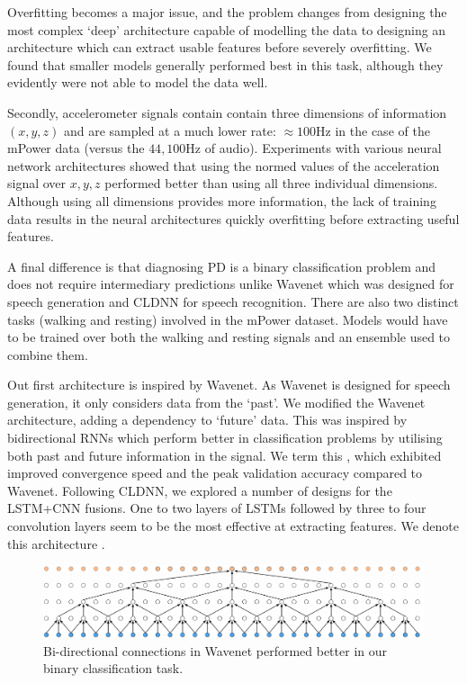 \documentclass[12pt, twoside]{book}
\renewcommand\emph[1]{\textit{\color{USred}{#1}}}
\begin{document}
Overfitting becomes a major issue, and the problem changes from designing the most complex `deep' architecture capable of modelling the data to designing an architecture which can extract usable features before severely overfitting. We found that smaller models generally performed best in this task, although they evidently were not able to model the data well. 

Secondly, accelerometer signals contain contain three dimensions of information $(x,y,z)$ and are sampled at a much lower rate: $\approx100$Hz in the case of the mPower data (versus the $44,100$Hz of audio). Experiments with various neural network architectures showed that using the normed values of the acceleration signal over $x,y,z$ performed better than using all three individual dimensions. Although using all dimensions provides more information, the lack of training data results in the neural architectures quickly overfitting before extracting useful features. 

A final difference is that diagnosing PD is a binary classification problem and does not require intermediary predictions unlike Wavenet which was designed for speech generation and CLDNN for speech recognition. There are also two distinct tasks (walking and resting) involved in the mPower dataset. Models would have to be trained over both the walking and resting signals and an ensemble used to combine them.  

Out first architecture is inspired by Wavenet. As Wavenet is designed for speech generation, it only considers data from the `past'. We modified the Wavenet architecture, adding a dependency to `future' data. This was inspired by bidirectional RNNs which perform better in classification problems by utilising both past and future information in the signal. We term this \emph{Bi-Wavenet}, which exhibited improved convergence speed and the peak validation accuracy compared to Wavenet. Following CLDNN, we explored a number of designs for the LSTM+CNN fusions. One to two layers of LSTMs followed by three to four convolution layers seem to be the most effective at extracting features. We denote this architecture \emph{LSTMConv}. 


\begin{figure}[h]
	\label{biwavenet}
	\centering\centerline{\includegraphics[width=1\linewidth]{biwavenet.png}}
	\caption{Bi-directional connections in Wavenet performed better in our binary classification task. }
\end{figure}
\end{document}
